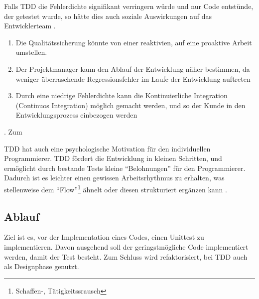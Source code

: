   Falls TDD die Fehlerdichte signifikant verringern würde und nur Code entstünde, der getestet wurde, so hätte dies auch soziale Auswirkungen auf das Entwicklerteam \citep[S. x]{beck_test_2002}. 
  \begin{enumerate}
   \item Die Qualitätssicherung könnte von einer reaktivien, auf eine proaktive Arbeit umstellen.
   \item Der Projektmanager kann den Ablauf der Entwicklung näher bestimmen, da weniger überraschende Regressionsfehler im Laufe der Entwicklung auftreten
   \item Durch eine niedrige Fehlerdichte kann die Kontinuierliche Integration (Continuos Integration) möglich gemacht werden, und so der Kunde in den Entwicklungsprozess einbezogen werden
  \end{enumerate}
 . Zum 
  
  TDD hat auch eine psychologische Motivation für den individuellen Programmierer.
  TDD fördert die Entwicklung in kleinen Schritten, und ermöglicht durch bestande Tests kleine "`Belohnungen"' für den Programmierer. Dadurch ist es leichter einen gewissen Arbeitsrhythmus zu erhalten, was stellenweise dem "`Flow"'\footnote{Schaffen-, Tätigkeitssrausch}  ähnelt oder diesen strukturiert ergänzen kann \citep{roger_brown_test_2008}.
  
\subsection{Ablauf}
  Ziel ist es, vor der Implementation eines Codes, einen Unittest zu implementieren. Davon ausgehend soll der geringstmögliche Code implementiert werden, damit der Test besteht. Zum Schluss wird refaktorisiert, bei TDD auch als Designphase genutzt.
  
